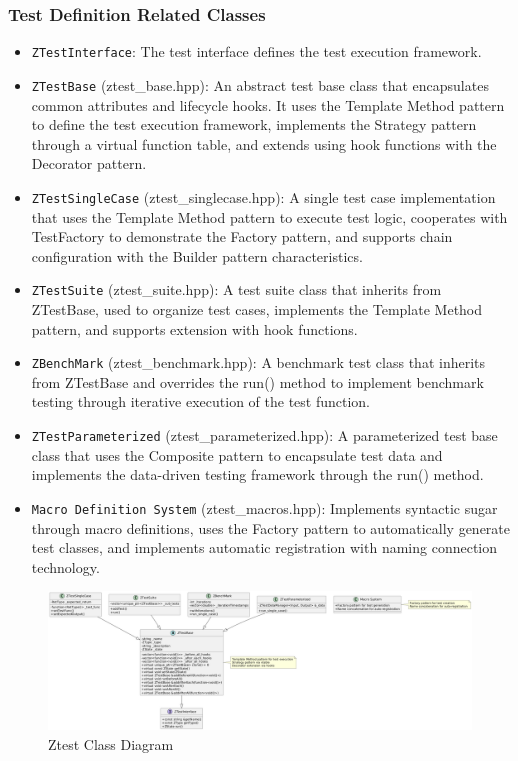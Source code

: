 \documentclass{article}
\begin{document}
\subsubsection{Test Definition Related Classes}
\begin{itemize}
    \item \texttt{ZTestInterface}: The test interface defines the test execution framework.
    \item \texttt{ZTestBase} (ztest\_base.hpp): An abstract test base class that encapsulates common attributes and lifecycle hooks. It uses the Template Method pattern to define the test execution framework, implements the Strategy pattern through a virtual function table, and extends using hook functions with the Decorator pattern.
    \item \texttt{ZTestSingleCase} (ztest\_singlecase.hpp): A single test case implementation that uses the Template Method pattern to execute test logic, cooperates with TestFactory to demonstrate the Factory pattern, and supports chain configuration with the Builder pattern characteristics.
    \item \texttt{ZTestSuite} (ztest\_suite.hpp): A test suite class that inherits from ZTestBase, used to organize test cases, implements the Template Method pattern, and supports extension with hook functions.
    \item \texttt{ZBenchMark} (ztest\_benchmark.hpp): A benchmark test class that inherits from ZTestBase and overrides the run() method to implement benchmark testing through iterative execution of the test function.
    \item \texttt{ZTestParameterized} (ztest\_parameterized.hpp): A parameterized test base class that uses the Composite pattern to encapsulate test data and implements the data-driven testing framework through the run() method.
    \item \texttt{Macro Definition System} (ztest\_macros.hpp): Implements syntactic sugar through macro definitions, uses the Factory pattern to automatically generate test classes, and implements automatic registration with naming connection technology.
\end{itemize}
\begin{figure}[H]
    \centering
    \includegraphics[width = \textwidth]{img/c1.png} %
    \caption{Ztest Class Diagram}
    \label{fig:ztest class }
\end{figure}
\end{document}
